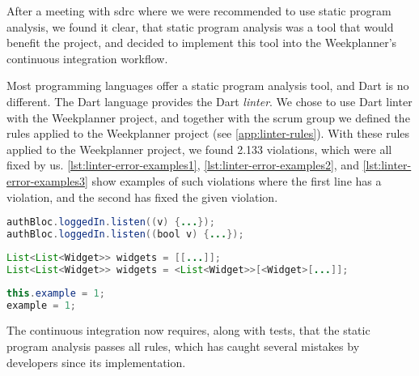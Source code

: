After a meeting with \gls{sdrc} where we were recommended to use static program analysis, we found it clear, that static program analysis was a tool that would benefit the project, and decided to implement this tool into the Weekplanner's continuous integration workflow.

Most programming languages offer a static program analysis tool, and Dart is no different. The Dart language provides the Dart \textit{linter}\cite{dart_linter_2019}. We chose to use Dart linter with the Weekplanner project, and together with the scrum group we defined the rules applied to the Weekplanner project (see \autoref{app:linter-rules}). With these rules applied to the Weekplanner project, we found 2.133 violations, which were all fixed by us. \autoref{lst:linter-error-examples1}, \autoref{lst:linter-error-examples2}, and \autoref{lst:linter-error-examples3} show examples of such violations where the first line has a violation, and the second has fixed the given violation.

\begin{lstlisting}[label={lst:linter-error-examples1},caption={Missing type for parameter},language=java]
authBloc.loggedIn.listen((v) {...});
authBloc.loggedIn.listen((bool v) {...});
\end{lstlisting}

\begin{lstlisting}[label={lst:linter-error-examples2},caption={Missing type for array and array elements},language=java]
List<List<Widget>> widgets = [[...]];
List<List<Widget>> widgets = <List<Widget>>[<Widget>[...]];
\end{lstlisting}

\begin{lstlisting}[label={lst:linter-error-examples3},caption={Avoid using \textit{this} keyword if not necessary},language=java]
this.example = 1;
example = 1;
\end{lstlisting}


The continuous integration now requires, along with tests, that the static program analysis passes all rules, which has caught several mistakes by developers since its implementation.
